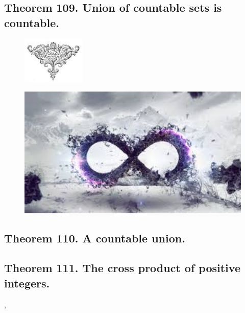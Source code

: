 \documentclass[preview]{standalone}
\begin{document}
\subsection[Union of countable sets is countable.]{
    \color{section} Theorem 109. \color{black} Union of countable sets is countable.
}

\vspace{1\baselineskip}
\begin{figure}[!h]
    \centering
    \includegraphics[width=3cm]{../resources/jpg/2.4.sequences.and.summations/symbol6.jpg}
\end{figure}
\pagebreak


\begin{figure}[!h]
    \centering
    \includegraphics[width=14cm]{../resources/jpg/2.4.sequences.and.summations/infinity.jpg}
\end{figure}
\subsection[A countable union of countable sets is countable.]{
    \color{section} Theorem 110. \color{black} A countable union.
}

\pagebreak


\subsection[The Cartesian product of positive integers.]{
    \color{section} Theorem 111. \color{black} The cross product of positive integers.
}

\sep
\end{document}
